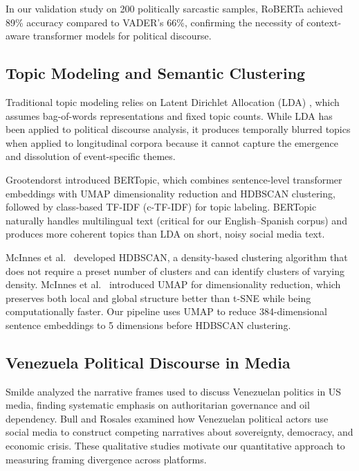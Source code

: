 \documentclass[12pt, letterpaper]{article}
\begin{document}
In our validation study on 200 politically sarcastic samples, RoBERTa achieved 89\% accuracy compared to VADER's 66\%, confirming the necessity of context-aware transformer models for political discourse.

\subsection{Topic Modeling and Semantic Clustering}

Traditional topic modeling relies on Latent Dirichlet Allocation (LDA) \cite{blei2003lda}, which assumes bag-of-words representations and fixed topic counts. While LDA has been applied to political discourse analysis, it produces temporally blurred topics when applied to longitudinal corpora because it cannot capture the emergence and dissolution of event-specific themes.

Grootendorst \cite{grootendorst2022bertopic} introduced BERTopic, which combines sentence-level transformer embeddings with UMAP dimensionality reduction and HDBSCAN clustering, followed by class-based TF-IDF (c-TF-IDF) for topic labeling. BERTopic naturally handles multilingual text (critical for our English--Spanish corpus) and produces more coherent topics than LDA on short, noisy social media text.

McInnes et al.\ \cite{mcinnes2017hdbscan} developed HDBSCAN, a density-based clustering algorithm that does not require a preset number of clusters and can identify clusters of varying density. McInnes et al.\ \cite{mcinnes2018umap} introduced UMAP for dimensionality reduction, which preserves both local and global structure better than t-SNE while being computationally faster. Our pipeline uses UMAP to reduce 384-dimensional sentence embeddings to 5 dimensions before HDBSCAN clustering.

\subsection{Venezuela Political Discourse in Media}

Smilde \cite{smilde2015venezuela} analyzed the narrative frames used to discuss Venezuelan politics in US media, finding systematic emphasis on authoritarian governance and oil dependency. Bull and Rosales \cite{bull2020venezuela} examined how Venezuelan political actors use social media to construct competing narratives about sovereignty, democracy, and economic crisis. These qualitative studies motivate our quantitative approach to measuring framing divergence across platforms.
\end{document}
